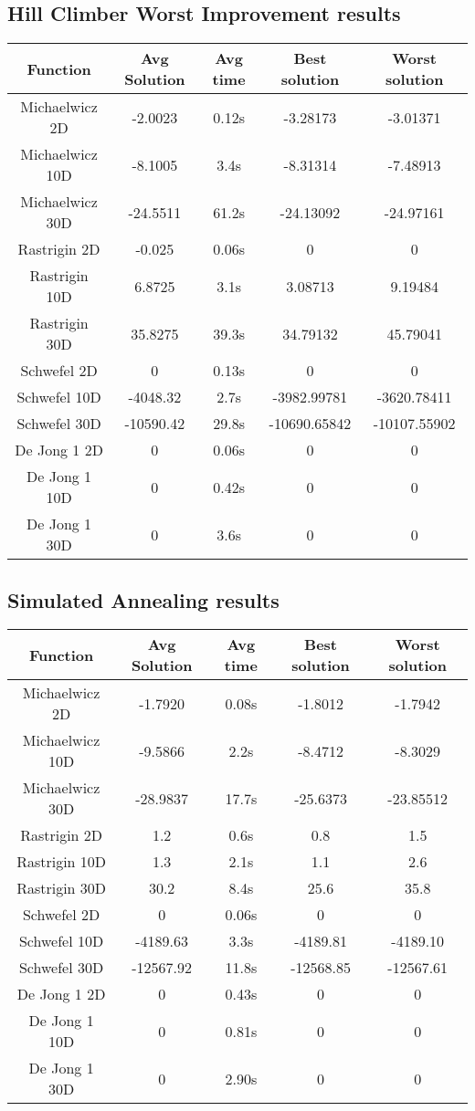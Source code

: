 \documentclass{article}
\begin{document}
\subsection{Hill Climber Worst Improvement results}

\begin{tabular}{|c|c|c|c|c|}
\hline
 Function & Avg Solution & Avg time & Best solution & Worst solution \\ \hline
Michaelwicz 2D & -2.0023 & 0.12s & -3.28173 & -3.01371 \\ \hline
Michaelwicz 10D & -8.1005 & 3.4s & -8.31314 & -7.48913 \\ \hline
Michaelwicz 30D & -24.5511 & 61.2s & -24.13092 & -24.97161 \\ \hline
Rastrigin 2D & -0.025 & 0.06s & 0 & 0 \\ \hline
Rastrigin 10D & 6.8725 & 3.1s & 3.08713 & 9.19484 \\ \hline
Rastrigin 30D & 35.8275 & 39.3s & 34.79132 & 45.79041 \\ \hline
Schwefel 2D & 0 & 0.13s & 0 & 0 \\ \hline
Schwefel 10D & -4048.32 & 2.7s & -3982.99781 & -3620.78411 \\ \hline
Schwefel 30D & -10590.42 & 29.8s & -10690.65842 & -10107.55902 \\ \hline
De Jong 1 2D & 0 & 0.06s & 0 & 0 \\ \hline
De Jong 1 10D & 0 & 0.42s & 0 & 0 \\ \hline
De Jong 1 30D & 0 & 3.6s & 0 & 0 \\ \hline
\end{tabular}

\subsection{Simulated Annealing results}

\begin{tabular}{|c|c|c|c|c|}
\hline
 Function & Avg Solution & Avg time & Best solution & Worst solution \\ \hline
Michaelwicz 2D & -1.7920 & 0.08s & -1.8012 & -1.7942 \\ \hline
Michaelwicz 10D & -9.5866 & 2.2s & -8.4712 & -8.3029 \\ \hline
Michaelwicz 30D & -28.9837 & 17.7s & -25.6373 & -23.85512 \\ \hline
Rastrigin 2D & 1.2 & 0.6s & 0.8 & 1.5 \\ \hline
Rastrigin 10D & 1.3 & 2.1s & 1.1 & 2.6 \\ \hline
Rastrigin 30D & 30.2 & 8.4s & 25.6 & 35.8 \\ \hline
Schwefel 2D & 0 & 0.06s & 0 & 0 \\ \hline
Schwefel 10D & -4189.63 & 3.3s & -4189.81 & -4189.10 \\ \hline
Schwefel 30D & -12567.92 & 11.8s & -12568.85 & -12567.61 \\ \hline
De Jong 1 2D & 0 & 0.43s & 0 & 0 \\ \hline
De Jong 1 10D & 0 & 0.81s & 0 & 0 \\ \hline
De Jong 1 30D & 0 & 2.90s & 0 & 0 \\ \hline
\end{tabular}
\end{document}
